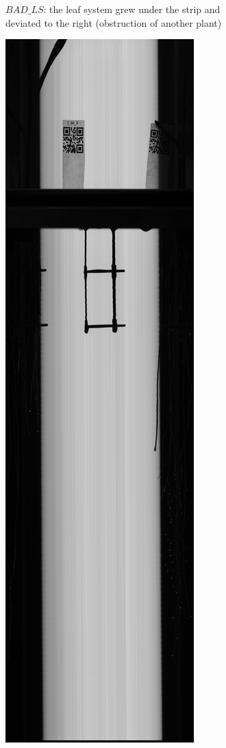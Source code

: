 \begin{figure}
\begin{subfigure}[t]{.13\textwidth}
  \caption{$BAD\_LS$: the leaf system grew under the strip and deviated to the right (obstruction of another plant)}
  \label{fig:BAD_LS}
\end{subfigure}
%
\begin{subfigure}[t]{.13\textwidth}
  \centering
  \includegraphics[width=\linewidth]{figures/NO_SEED.jpg}

\end{subfigure}
\end{figure}
